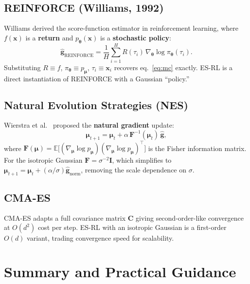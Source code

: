 \documentclass[12pt, a4paper]{article}
\newcommand{\bmu}{\boldsymbol{\mu}}
\newcommand{\btheta}{\boldsymbol{\theta}}
\newcommand{\bx}{\mathbf{x}}
\newcommand{\EE}{\mathbb{E}}
\begin{document}
\subsection{REINFORCE (Williams, 1992)}

Williams \cite{williams1992} derived the score-function estimator in
reinforcement learning, where $f(\bx)$ is a \textbf{return} and
$p_{\btheta}(\bx)$ is a \textbf{stochastic policy}:
\begin{equation}
  \hat{\mathbf{g}}_{\mathrm{REINFORCE}}
  = \frac{1}{H}\sum_{i=1}^{H}
    R(\tau_i)\,\nabla_{\btheta}\log\pi_{\btheta}(\tau_i).
\end{equation}
Substituting $R\equiv f$, $\pi_{\btheta}\equiv p_{\bmu}$,
$\tau_i\equiv\bx_i$ recovers eq.~\eqref{eq:mc} exactly.
ES-RL is a direct instantiation of REINFORCE with a Gaussian ``policy.''

\subsection{Natural Evolution Strategies (NES)}

Wierstra et al.\ \cite{wierstra2008, wierstra2014} proposed the
\textbf{natural gradient} update:
\begin{equation}
  \bmu_{t+1} = \bmu_t + \alpha\,\mathbf{F}^{-1}(\bmu_t)\,\hat{\mathbf{g}},
\end{equation}
where $\mathbf{F}(\bmu)=\EE\!\bigl[(\nabla_{\bmu}\log p_{\bmu})
(\nabla_{\bmu}\log p_{\bmu})^\top\bigr]$ is the Fisher information matrix.
For the isotropic Gaussian $\mathbf{F}=\sigma^{-2}\mathbf{I}$, which
simplifies to $\bmu_{t+1}=\bmu_t+(\alpha/\sigma)\hat{\mathbf{g}}_{\mathrm{norm}}$,
removing the scale dependence on $\sigma$.

\subsection{CMA-ES}

CMA-ES \cite{hansen2001} adapts a full covariance matrix
$\mathbf{C}$ giving second-order-like convergence at $O(d^2)$ cost per step.
ES-RL with an isotropic Gaussian is a first-order $O(d)$ variant, trading
convergence speed for scalability.

\section{Summary and Practical Guidance}
\label{sec:summary}
\end{document}
